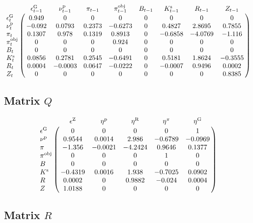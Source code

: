 $$\bordermatrix{
~ & \epsilon^{\mathrm{G}}_{t-1} & \nu^{\mathrm{p}}_{t-1} & \pi_{t-1} & \pi^{\mathrm{obj}}_{t-1} & B_{t-1} & K^{\mathrm{s}}_{t-1} & R_{t-1} & Z_{t-1} \cr
\epsilon^{\mathrm{G}}_{t} & 0.949 & 0 & 0 & 0 & 0 & 0 & 0 & 0 \cr
\nu^{\mathrm{p}}_{t} & -0.092 & 0.0793 & 0.2373 & -0.6273 & 0 & 0.4827 & 2.8695 & 0.7855 \cr
\pi_{t} & 0.1307 & 0.978 & 0.1319 & 0.8913 & 0 & -0.6858 & -4.0769 & -1.116 \cr
\pi^{\mathrm{obj}}_{t} & 0 & 0 & 0 & 0.924 & 0 & 0 & 0 & 0 \cr
B_{t} & 0 & 0 & 0 & 0 & 0 & 0 & 0 & 0 \cr
K^{\mathrm{s}}_{t} & 0.0856 & 0.2781 & 0.2545 & -0.6491 & 0 & 0.5181 & 1.8624 & -0.3555 \cr
R_{t} & 0.0004 & -0.0003 & 0.0647 & -0.0222 & 0 & -0.0007 & 0.9496 & 0.0002 \cr
Z_{t} & 0 & 0 & 0 & 0 & 0 & 0 & 0 & 0.8385 \cr
}$$

\subsection*{Matrix $Q$}

$$\bordermatrix{
~ & \epsilon^{\mathrm{Z}} & \eta^{\mathrm{p}} & \eta^{\mathrm{R}} & \eta^{\pi} & \eta^{\mathrm{G}} \cr
\epsilon^{\mathrm{G}} & 0 & 0 & 0 & 0 & 1 \cr
\nu^{\mathrm{p}} & 0.9544 & 0.0014 & 2.986 & -0.6789 & -0.0969 \cr
\pi & -1.356 & -0.0021 & -4.2424 & 0.9646 & 0.1377 \cr
\pi^{\mathrm{obj}} & 0 & 0 & 0 & 1 & 0 \cr
B & 0 & 0 & 0 & 0 & 0 \cr
K^{\mathrm{s}} & -0.4319 & 0.0016 & 1.938 & -0.7025 & 0.0902 \cr
R & 0.0002 & 0 & 0.9882 & -0.024 & 0.0004 \cr
Z & 1.0188 & 0 & 0 & 0 & 0 \cr
}$$

\subsection*{Matrix $R$}

